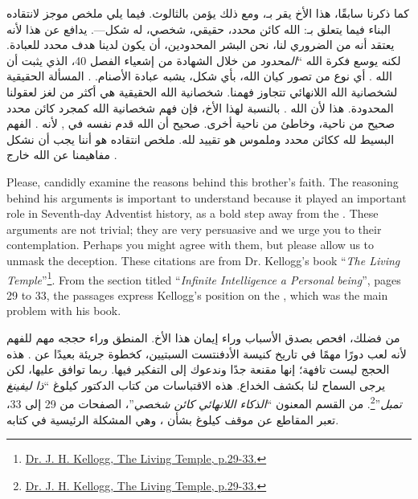 كما ذكرنا سابقًا، هذا الأخ يقر بـ، ومع ذلك يؤمن بالثالوث. فيما يلي ملخص موجز لانتقاده البناء فيما يتعلق بـ: الله كائن محدد، حقيقي، شخصي، له شكل—. يدافع عن هذا لأنه يعتقد أنه من الضروري لنا، نحن البشر المحدودين، أن يكون لدينا هدف محدد للعبادة. لكنه يوسع فكرة الله “\textit{المحدود} من خلال الشهادة من إشعياء الفصل 40، الذي يثبت أن الله . أي نوع من تصور كيان الله، بأي شكل، يشبه عبادة الأصنام. . المسألة الحقيقية لشخصانية الله اللانهائي تتجاوز فهمنا. شخصانية الله الحقيقية هي أكثر من لغز لعقولنا المحدودة. هذا لأن الله . بالنسبة لهذا الأخ، فإن فهم شخصانية الله كمجرد كائن محدد صحيح من ناحية، وخاطئ من ناحية أخرى. صحيح أن الله قدم نفسه في , لأنه . الفهم البسيط لله ككائن محدد وملموس هو تقييد لله. ملخص انتقاده هو أننا يجب أن نشكل مفاهيمنا عن الله خارج .


Please, candidly examine the reasons behind this brother’s faith. The reasoning behind his arguments is important to understand because it played an important role in Seventh-day Adventist history, as a bold step away from the . These arguments are not trivial; they are very persuasive and we urge you to their contemplation. Perhaps you might agree with them, but please allow us to unmask the deception. These citations are from Dr. Kellogg’s book “\textit{The Living Temple}”\footnote{\href{https://archive.org/details/J.H.Kellogg.TheLivingTemple1903}{Dr. J. H. Kellogg, The Living Temple, p.29-33.}}. From the section titled “\textit{Infinite Intelligence a Personal being}”, pages 29 to 33, the passages express Kellogg’s position on the , which was the main problem with his book.


من فضلك، افحص بصدق الأسباب وراء إيمان هذا الأخ. المنطق وراء حججه مهم للفهم لأنه لعب دورًا مهمًا في تاريخ كنيسة الأدفنتست السبتيين، كخطوة جريئة بعيدًا عن . هذه الحجج ليست تافهة؛ إنها مقنعة جدًا وندعوك إلى التفكير فيها. ربما توافق عليها، لكن يرجى السماح لنا بكشف الخداع. هذه الاقتباسات من كتاب الدكتور كيلوغ “\textit{ذا ليفينغ تمبل}”\footnote{\href{https://archive.org/details/J.H.Kellogg.TheLivingTemple1903}{Dr. J. H. Kellogg, The Living Temple, p.29-33.}}. من القسم المعنون “\textit{الذكاء اللانهائي كائن شخصي}”، الصفحات من 29 إلى 33، تعبر المقاطع عن موقف كيلوغ بشأن ، وهي المشكلة الرئيسية في كتابه.


